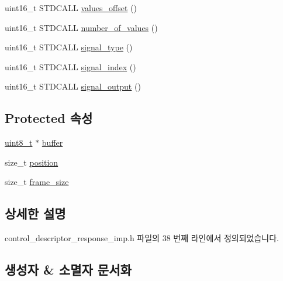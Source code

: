 \begin{DoxyCompactItemize}
\item 
uint16\+\_\+t S\+T\+D\+C\+A\+LL \hyperlink{classavdecc__lib_1_1control__descriptor__response__imp_ae97631b556b9ce737d8a600a21958aab}{values\+\_\+offset} ()
\item 
uint16\+\_\+t S\+T\+D\+C\+A\+LL \hyperlink{classavdecc__lib_1_1control__descriptor__response__imp_a70ca07a10a0f710e7129cbc8c5ceadac}{number\+\_\+of\+\_\+values} ()
\item 
uint16\+\_\+t S\+T\+D\+C\+A\+LL \hyperlink{classavdecc__lib_1_1control__descriptor__response__imp_a34860693b568102d329b58e59fc48de5}{signal\+\_\+type} ()
\item 
uint16\+\_\+t S\+T\+D\+C\+A\+LL \hyperlink{classavdecc__lib_1_1control__descriptor__response__imp_a241ca834786f33bea20ff8108b16655c}{signal\+\_\+index} ()
\item 
uint16\+\_\+t S\+T\+D\+C\+A\+LL \hyperlink{classavdecc__lib_1_1control__descriptor__response__imp_a9959f2c7f3f5be25a66967f1b8feba97}{signal\+\_\+output} ()
\end{DoxyCompactItemize}
\subsection*{Protected 속성}
\begin{DoxyCompactItemize}
\item 
\hyperlink{stdint_8h_aba7bc1797add20fe3efdf37ced1182c5}{uint8\+\_\+t} $\ast$ \hyperlink{classavdecc__lib_1_1descriptor__response__base__imp_a56ed84df35de10bdb65e72b184309497}{buffer}
\item 
size\+\_\+t \hyperlink{classavdecc__lib_1_1descriptor__response__base__imp_a7a04afe5347934be732ec70a70bd0a28}{position}
\item 
size\+\_\+t \hyperlink{classavdecc__lib_1_1descriptor__response__base__imp_affd041a595cabab98275245b9cb2824d}{frame\+\_\+size}
\end{DoxyCompactItemize}


\subsection{상세한 설명}


control\+\_\+descriptor\+\_\+response\+\_\+imp.\+h 파일의 38 번째 라인에서 정의되었습니다.



\subsection{생성자 \& 소멸자 문서화}
